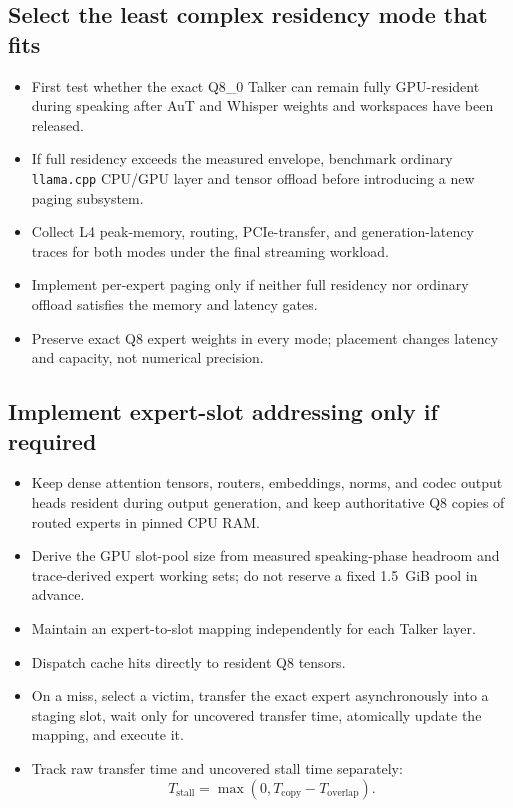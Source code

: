 \documentclass[10pt,letterpaper]{article}
\newcommand{\code}[1]{\texttt{#1}}
\begin{document}
\subsection{Select the least complex residency mode that fits}
\begin{itemize}
    \item First test whether the exact Q8\_0 Talker can remain fully GPU-resident during speaking after AuT and Whisper weights and workspaces have been released.
    \item If full residency exceeds the measured envelope, benchmark ordinary \code{llama.cpp} CPU/GPU layer and tensor offload before introducing a new paging subsystem.
    \item Collect L4 peak-memory, routing, PCIe-transfer, and generation-latency traces for both modes under the final streaming workload.
    \item Implement per-expert paging only if neither full residency nor ordinary offload satisfies the memory and latency gates.
    \item Preserve exact Q8 expert weights in every mode; placement changes latency and capacity, not numerical precision.
\end{itemize}

\subsection{Implement expert-slot addressing only if required}
\begin{itemize}
    \item Keep dense attention tensors, routers, embeddings, norms, and codec output heads resident during output generation, and keep authoritative Q8 copies of routed experts in pinned CPU RAM.
    \item Derive the GPU slot-pool size from measured speaking-phase headroom and trace-derived expert working sets; do not reserve a fixed 1.5~GiB pool in advance.
    \item Maintain an expert-to-slot mapping independently for each Talker layer.
    \item Dispatch cache hits directly to resident Q8 tensors.
    \item On a miss, select a victim, transfer the exact expert asynchronously into a staging slot, wait only for uncovered transfer time, atomically update the mapping, and execute it.
    \item Track raw transfer time and uncovered stall time separately:
    \[
    T_{\mathrm{stall}}=\max\left(0,T_{\mathrm{copy}}-T_{\mathrm{overlap}}\right).
    \]
\end{itemize}
\end{document}
